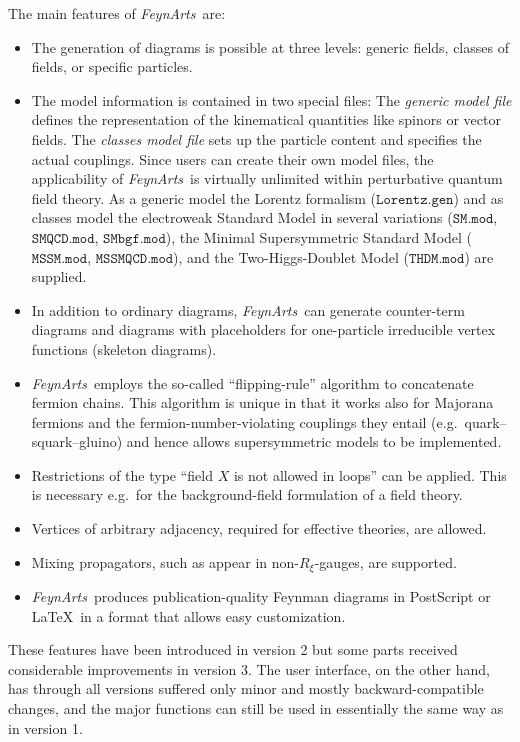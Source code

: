 \documentclass[twoside,12pt]{article}
\def\FA{\textit{FeynArts}}
\def\eg{e.g.\ }
\def\Code#1{\ensuremath{\texttt{#1}}}
\begin{document}
The main features of \FA\ are:
\begin{itemize}
\item
The generation of diagrams is possible at three levels: generic fields,
classes of fields, or specific particles.

\item
The model information is contained in two special files:
The \emph{generic model file} defines the representation of the
kinematical quantities like spinors or vector fields.  The \emph{classes
model file} sets up the particle content and specifies the actual
couplings.  Since users can create their own model files, the applicability
of \FA\ is virtually unlimited within perturbative quantum field
theory.  As a generic model the Lorentz formalism (\Code{Lorentz.gen}) and 
as classes model the electroweak Standard Model in several variations 
(\Code{SM.mod}, \Code{SMQCD.mod}, \Code{SMbgf.mod}), the Minimal 
Supersymmetric Standard Model (\Code{MSSM.mod}, \Code{MSSMQCD.mod}), and
the Two-Higgs-Doublet Model (\Code{THDM.mod}) are supplied.

\item
In addition to ordinary diagrams, \FA\ can generate counter-term diagrams
and diagrams with placeholders for one-particle irreducible vertex
functions (skeleton diagrams).

\item
\FA\ employs the so-called ``flipping-rule'' algorithm \cite{DeEHK92} to
concatenate fermion chains.  This algorithm is unique in that it works
also for Majorana fermions and the fermion-number-violating couplings they
entail (\eg quark--squark--gluino) and hence allows supersymmetric models
to be implemented.

\item
Restrictions of the type ``field $X$ is not allowed in loops'' can be
applied.  This is necessary \eg for the background-field formulation of a
field theory.

\item
Vertices of arbitrary adjacency, required for effective theories, are
allowed.

\item
Mixing propagators, such as appear in non-$R_\xi$-gauges, are supported.

\item
\FA\ produces publication-quality Feynman diagrams in PostScript or
\LaTeX\ in a format that allows easy customization.
\end{itemize}
These features have been introduced in version 2 but some parts received 
considerable improvements in version 3.  The user interface, on the other 
hand, has through all versions suffered only minor and mostly 
backward-compatible changes, and the major functions can still be used in 
essentially the same way as in version 1.
\end{document}
